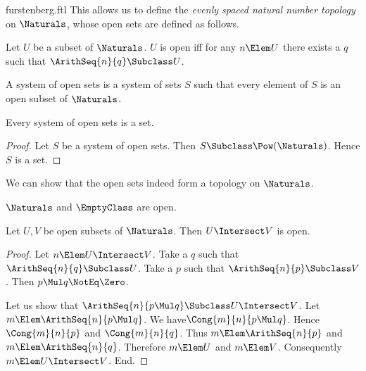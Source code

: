 \documentclass{stex}
\begin{document}
\begin{smodule}{furstenberg.ftl}
This allows us to define the \textit{evenly spaced natural number
topology} on $\Naturals$, whose open sets are defined as follows.

\begin{forthel}
  \begin{definition}[for=open]
    Let $U$ be a subset of $\Naturals$.
    $U$ is open iff for any $n \Elem U$ there exists a $q$ such that
    $\ArithSeq{n}{q} \Subclass U$.
  \end{definition}

  \begin{definition}[for=system of open sets]
    A system of open sets is a system of sets $S$ such that every element of
    $S$ is an open subset of $\Naturals$.
  \end{definition}

  \begin{lemma}
    Every system of open sets is a set.
  \end{lemma}
  \begin{proof}
    Let $S$ be a system of open sets.
    Then $S \Subclass \Pow(\Naturals)$.
    Hence $S$ is a set.
  \end{proof}
\end{forthel}

We can show that the open sets indeed form a topology on $\Naturals$.

\begin{forthel}
  \begin{lemma}
    $\Naturals$ and $\EmptyClass$ are open.
  \end{lemma}

  \begin{lemma}
    Let $U,V$ be open subsets of $\Naturals$.
    Then $U \Intersect V$ is open.
  \end{lemma}
  \begin{proof}
    Let $n \Elem U \Intersect V$.
    Take a $q$ such that $\ArithSeq{n}{q} \Subclass U$.
    Take a $p$ such that $\ArithSeq{n}{p} \Subclass V$.
    Then $p \Mul q \NotEq \Zero$.

    Let us show that $\ArithSeq{n}{p \Mul q} \Subclass U \Intersect V$.
      Let $m \Elem \ArithSeq{n}{p \Mul q}$.
      We have\linebreak $\Cong{m}{n}{p \Mul q}$.
      Hence $\Cong{m}{n}{p}$ and $\Cong{m}{n}{q}$.
      Thus $m \Elem \ArithSeq{n}{p}$ and $m \Elem \ArithSeq{n}{q}$.
      Therefore $m \Elem U$ and $m \Elem V$.
      Consequently $m \Elem U \Intersect V$.
    End.
  \end{proof}


\end{forthel}
\end{smodule}
\end{document}
